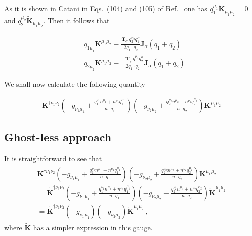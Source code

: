 \documentclass[a4paper,11pt]{article}
\numberwithin{equation}{section}
\newcommand{\ldot}{\!\cdot\!}
\newcommand{\bd}[1]{\mathbf{#1}}
\begin{document}
As it is shown in Catani in Eqs.~(104) and (105) of Ref.~\cite{Catani:1999ss} one has
$q_{1}^{\mu_1}  \widetilde{\bd{K}}_{\mu_1\mu_2}=0$ and  $q_{2}^{\mu_2} \widetilde{\bd{K}}_{\mu_1\mu_2}$. Then it follows that

\begin{align*}
&q_{1\mu_1}\bd{K}^{\mu_1\mu_2}\equiv  
 \frac{ \bd{T}_{q_1} q_2^{\mu_2} q_1^\alpha}{2q_1\ldot q_2}  \bd{J}_\alpha(q_1+q_2)\\
 &q_{2\mu_2}\bd{K}^{\mu_1\mu_2}\equiv  
 \frac{- \bd{T}_{q_1} q_1^{\mu_1} q_2^\alpha}{2q_1\ldot q_2}  \bd{J}_\alpha(q_1+q_2)
\end{align*}

We shall now calculate the following quantity

\begin{align}
 \bd{K}^{\dagger\nu_1\nu_2} 
 \left( 
 -g_{\nu_1\mu_1}+ \frac{q_1^{\nu_1}n^{\mu_1}+ n^{\nu_1}q_1^{\mu_1}}{n\cdot q_1}
 \right) 
  \left( 
 -g_{\nu_2\mu_2}+ \frac{q_2^{\nu_2}n^{\mu_2}+ n^{\nu_2}q_2^{\mu_2}}{n\cdot q_2}
 \right) 
 \bd{K}^{\mu_1\mu_2}
\end{align}


\subsection{Ghost-less approach}

It is straightforward to see that 
\begin{align}
\begin{gathered}
 \bd{K}^{\dagger\nu_1\nu_2} 
 \left( 
 -g_{\nu_1\mu_1}+ \frac{q_1^{\nu_1}n^{\mu_1}+ n^{\nu_1}q_1^{\mu_1}}{n\cdot q_1}
 \right) 
  \left( 
 -g_{\nu_2\mu_2}+ \frac{q_2^{\nu_2}n^{\mu_2}+ n^{\nu_2}q_2^{\mu_2}}{n\cdot q_2}
 \right) 
 \bd{K}^{\mu_1\mu_2}\\
 =
 \widetilde{\bd{K}}^{\dagger\nu_1\nu_2} 
 \left( 
 -g_{\nu_1\mu_1}+ \frac{q_1^{\nu_1}n^{\mu_1}+ n^{\nu_1}q_1^{\mu_1}}{n\cdot q_1}
 \right) 
  \left( 
 -g_{\nu_2\mu_2}+ \frac{q_2^{\nu_2}n^{\mu_2}+ n^{\nu_2}q_2^{\mu_2}}{n\cdot q_2}
 \right) 
  \widetilde{\bd{K}} ^{\mu_1\mu_2}\\
 =
 \widetilde{\bd{K}}^{\dagger\nu_1\nu_2} 
 \left( 
 -g_{\nu_1\mu_1}
 \right) 
  \left( 
 -g_{\nu_2\mu_2}
 \right) 
  \widetilde{\bd{K}} ^{\mu_1\mu_2}~,
  \end{gathered}
\end{align}
where  $\widetilde{\bd{K}}$ has a simpler expression in this gauge. 
\end{document}
